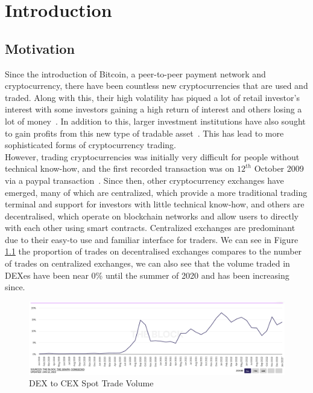 \chapter{Introduction}
\section{Motivation}
Since the introduction of Bitcoin, a peer-to-peer payment network and cryptocurrency, there have been countless new cryptocurrencies that are used and traded. Along with this, their high volatility has piqued a lot of retail investor's interest with some investors gaining a high return of interest and others losing a lot of money~\cite{losing_money_on_crypto_2021}. In addition to this, larger investment institutions have also sought to gain profits from this new type of tradable asset~\cite{gondek_what_nodate}. This has lead to more sophisticated forms of cryptocurrency trading.
\\[5mm]
However, trading cryptocurrencies was initially very difficult for people without technical know-how, and the first recorded transaction was on $12^{th}$ October 2009 via a paypal transaction~\cite{noauthor_history_nodate}. Since then, other cryptocurrency exchanges have emerged, many of which are centralized, which provide a more traditional trading terminal and support for investors with little technical know-how, and others are decentralised, which operate on blockchain networks and allow users to directly with each other using smart contracts. Centralized exchanges are predominant due to their easy-to use and familiar interface for traders. We can see in Figure \ref{fig:dex_to_cex} the proportion of trades on decentralised exchanges compares to the number of trades on centralized exchanges, we can also see that the volume traded in DEXes have been near 0\% until the summer of 2020 and has been increasing since. 

\begin{figure}[htb!]
    \centering
    \includegraphics[width=\textwidth]{introduction/Images/dex_to_cex.png}
    \caption{{DEX} to {CEX} {Spot} {Trade} {Volume}~\cite{dex_to_cex}}
    \label{fig:dex_to_cex}
\end{figure}

